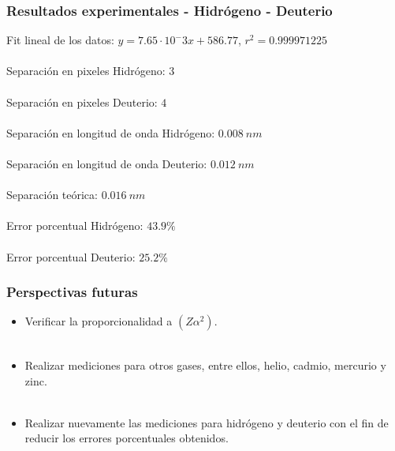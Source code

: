 \documentclass{beamer}
\begin{document}
\begin{frame}[fragile]
	\frametitle{Resultados experimentales - Hidrógeno - Deuterio}
	
	Fit lineal de los datos: $y = 7.65\cdot 10^-3 x + 586.77$,   $r^2 = 0.999971225$  
	\
	\\
	
	\
	\\
	
	Separación en pixeles Hidrógeno: $3$
	\
	\\
	
	\
	\\
	
	Separación en pixeles Deuterio: $4$
	\
	\\
		
	\
	\\
		
	Separación en longitud de onda Hidrógeno: $0.008\ nm$
	\
	\\
	
	\
	\\
	
	Separación en longitud de onda Deuterio: $0.012\ nm$
	\
	\\
	
	\
	\\
	
	Separación teórica: $ 0.016\ nm$
	\
	\\
	
	\
	\\
	
	Error porcentual Hidrógeno: $ 43.9\% $
	\
	\\
	
	\
	\\
	
	Error porcentual Deuterio: $ 25.2\% $
	
	
	
\end{frame}

\begin{frame}[fragile]
	\frametitle{Perspectivas futuras}
	
	\begin{itemize}
		\item Verificar la proporcionalidad a $(Z\alpha^2)$.
		\
		\\
		
		\
		\\
		
		\item Realizar mediciones para otros gases, entre ellos, helio, cadmio, mercurio y zinc.
		\
		\\
		
		\
		\\
		
		\item Realizar nuevamente las mediciones para hidrógeno y deuterio con el fin de reducir los errores porcentuales obtenidos.		
		
	\end{itemize}	
	
\end{frame}
\end{document}
